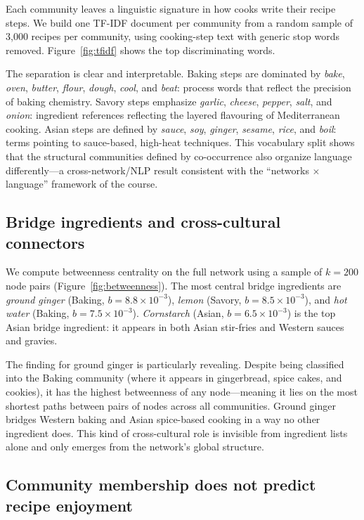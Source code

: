\documentclass[9pt,twocolumn]{pnas-new}
\begin{document}
Each community leaves a linguistic signature in how cooks write their recipe steps. We build one TF-IDF document per community from a random sample of 3,000 recipes per community, using cooking-step text with generic stop words removed. Figure~\ref{fig:tfidf} shows the top discriminating words.

The separation is clear and interpretable. Baking steps are dominated by \textit{bake}, \textit{oven}, \textit{butter}, \textit{flour}, \textit{dough}, \textit{cool}, and \textit{beat}: process words that reflect the precision of baking chemistry. Savory steps emphasize \textit{garlic}, \textit{cheese}, \textit{pepper}, \textit{salt}, and \textit{onion}: ingredient references reflecting the layered flavouring of Mediterranean cooking. Asian steps are defined by \textit{sauce}, \textit{soy}, \textit{ginger}, \textit{sesame}, \textit{rice}, and \textit{boil}: terms pointing to sauce-based, high-heat techniques. This vocabulary split shows that the structural communities defined by co-occurrence also organize language differently---a cross-network/NLP result consistent with the ``networks $\times$ language'' framework of the course.

\subsection*{Bridge ingredients and cross-cultural connectors}

We compute betweenness centrality on the full network using a sample of $k = 200$ node pairs (Figure~\ref{fig:betweenness}). The most central bridge ingredients are \textit{ground ginger} (Baking, $b = 8.8 \times 10^{-3}$), \textit{lemon} (Savory, $b = 8.5 \times 10^{-3}$), and \textit{hot water} (Baking, $b = 7.5 \times 10^{-3}$). \textit{Cornstarch} (Asian, $b = 6.5 \times 10^{-3}$) is the top Asian bridge ingredient: it appears in both Asian stir-fries and Western sauces and gravies.

The finding for ground ginger is particularly revealing. Despite being classified into the Baking community (where it appears in gingerbread, spice cakes, and cookies), it has the highest betweenness of any node---meaning it lies on the most shortest paths between pairs of nodes across all communities. Ground ginger bridges Western baking and Asian spice-based cooking in a way no other ingredient does. This kind of cross-cultural role is invisible from ingredient lists alone and only emerges from the network's global structure.

\subsection*{Community membership does not predict recipe enjoyment}
\end{document}
